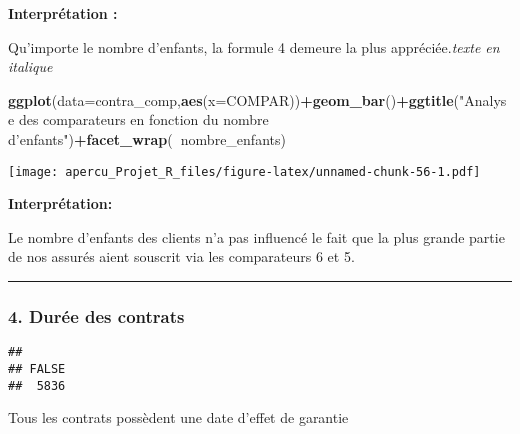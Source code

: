 \documentclass[
]{article}
\newenvironment{Shaded}{\begin{snugshade}}{\end{snugshade}}
\newcommand{\DataTypeTok}[1]{\textcolor[rgb]{0.13,0.29,0.53}{#1}}
\newcommand{\KeywordTok}[1]{\textcolor[rgb]{0.13,0.29,0.53}{\textbf{#1}}}
\newcommand{\NormalTok}[1]{#1}
\newcommand{\OperatorTok}[1]{\textcolor[rgb]{0.81,0.36,0.00}{\textbf{#1}}}
\newcommand{\StringTok}[1]{\textcolor[rgb]{0.31,0.60,0.02}{#1}}
\begin{document}
\textbf{Interprétation :}

Qu'importe le nombre d'enfants, la formule 4 demeure la plus
appréciée.\emph{texte en italique}

\begin{Shaded}
\begin{Highlighting}[]
\KeywordTok{ggplot}\NormalTok{(}\DataTypeTok{data=}\NormalTok{contra_comp,}\KeywordTok{aes}\NormalTok{(}\DataTypeTok{x=}\NormalTok{COMPAR))}\OperatorTok{+}\KeywordTok{geom_bar}\NormalTok{()}\OperatorTok{+}\KeywordTok{ggtitle}\NormalTok{(}\StringTok{"Analyse des comparateurs en fonction du nombre d'enfants"}\NormalTok{)}\OperatorTok{+}\KeywordTok{facet_wrap}\NormalTok{(}\OperatorTok{~}\NormalTok{nombre_enfants)}
\end{Highlighting}
\end{Shaded}

\texttt{[image: apercu\_Projet\_R\_files/figure-latex/unnamed-chunk-56-1.pdf]}

\textbf{Interprétation:}

Le nombre d'enfants des clients n'a pas influencé le fait que la plus
grande partie de nos assurés aient souscrit via les comparateurs 6 et 5.

\begin{center}\rule{0.5\linewidth}{0.5pt}\end{center}

\hypertarget{duruxe9e-des-contrats}{%
\subsubsection{4. Durée des contrats}\label{duruxe9e-des-contrats}}

\begin{Shaded}
\end{Shaded}

\begin{verbatim}
## 
## FALSE 
##  5836
\end{verbatim}

Tous les contrats possèdent une date d'effet de garantie

\begin{Shaded}
\end{Shaded}
\end{document}

